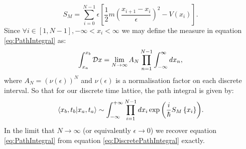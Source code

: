 \documentclass[12pt]{article}
\begin{document}
\begin{equation}
	\label{eq:DiscreteMinkowskiAction}
	S_{M} = \sum_{i=0}^{N-1} \epsilon \left[\frac{1}{2}m\left(\frac{x_{i+1}-x_{i}}{\epsilon}\right)^{2} - V\left(x_i\right)\right].
\end{equation}
Since $\forall i \in \left[1,N-1\right], -\infty < x_i < \infty$ we may define the measure in equation \ref{eq:PathIntegral} as:
\begin{equation}
	\label{eq:IntegralMeasure}
	\int_{x_a}^{x_b} {\cal D} x = \lim_{N\rightarrow \infty} A_{N}\prod_{n=1}^{N-1}\int_{-\infty}^{\infty}dx_n,
\end{equation}
where $A_N = \left(\nu \left(\epsilon\right)\right)^{N}$ and $\nu \left(\epsilon\right)$ is a normalisation factor on each discrete interval. So that for our discrete time lattice, the path integral is given by:
\begin{equation}
	\label{eq:DiscretePathIntegral}
	\braket{x_b,t_b|x_a,t_a} \sim \int^{+\infty}_{-\infty}\prod_{i=1}^{N-1}dx_i \exp{\left(\frac{i}{\hbar}S_M\left\{x_i\right\}\right)}.
\end{equation}
In the limit that $N\rightarrow \infty$ (or equivalently $\epsilon \rightarrow 0$) we recover equation \ref{eq:PathIntegral} from equation \ref{eq:DiscretePathIntegral} exactly. 
\end{document}
